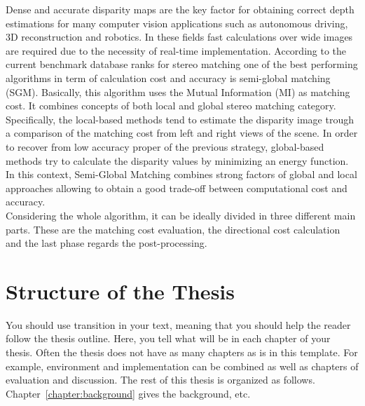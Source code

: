 Dense and accurate disparity maps are the key factor for obtaining correct depth estimations for many computer vision applications such as autonomous driving, 3D reconstruction and robotics.  
In these fields fast calculations over wide images are required due to the necessity of real-time implementation. 
According to the current benchmark database ranks for stereo matching one of the best performing algorithms in term of calculation cost and accuracy is semi-global matching (SGM)\citep{Hirschmuller2008}. 
Basically, this algorithm uses the Mutual Information (MI) as matching cost. It combines concepts of both local and global stereo matching category. 
Specifically, the local-based methods tend to estimate the disparity image trough a comparison of the matching cost from left and right views of the scene. 
In order to recover from low accuracy proper of the previous strategy, global-based methods try to calculate the disparity values by minimizing an energy function. 
In this context, Semi-Global Matching combines strong factors of global and local approaches allowing to obtain a good trade-off between computational cost and accuracy. \\
Considering the whole algorithm, it can be ideally divided in three different main parts. These are the matching cost evaluation, the directional cost calculation and the last phase regards the post-processing. 

\section{Structure of the Thesis}
\label{section:structure} 

You should use transition in your text, meaning that you should help
the reader follow the thesis outline. Here, you tell what will be in
each chapter of your thesis. Often the thesis does not have as many
chapters as is in this template. For example, environment and
implementation can be combined as well as chapters of evaluation and
discussion.  The rest of this thesis is organized as
follows. Chapter~\ref{chapter:background} gives the background, etc.

